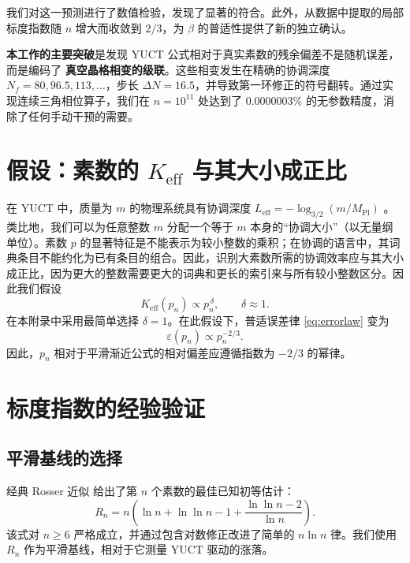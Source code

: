 \documentclass[11pt,a4paper]{article}
\begin{document}
	我们对这一预测进行了数值检验，发现了显著的符合。此外，从数据中提取的局部标度指数随 \(n\) 增大而收敛到 \(2/3\)，为 \(\beta\) 的普适性提供了新的独立确认。
	
	\textbf{本工作的主要突破}是发现 YUCT 公式相对于真实素数的残余偏差不是随机误差，而是编码了 \textbf{真空晶格相变的级联}。这些相变发生在精确的协调深度 \(N_f = 80, 96.5, 113, \dots\)，步长 \(\Delta N = 16.5\)，并导致第一环修正的符号翻转。通过实现连续三角相位算子，我们在 \(n=10^{11}\) 处达到了 \(0.0000003\%\) 的无参数精度，消除了任何手动干预的需要。
	
	\section{假设：素数的 \(K_{\mathrm{eff}}\) 与其大小成正比}
	在 YUCT 中，质量为 \(m\) 的物理系统具有协调深度 \(L_{\mathrm{eff}} = -\log_{3/2}(m/M_{\mathrm{Pl}})\) \cite{YakushevLaw2026}。类比地，我们可以为任意整数 \(m\) 分配一个等于 \(m\) 本身的“协调大小”（以无量纲单位）。素数 \(p\) 的显著特征是不能表示为较小整数的乘积；在协调的语言中，其词典条目不能约化为已有条目的组合。因此，识别大素数所需的协调效率应与其大小成正比，因为更大的整数需要更大的词典和更长的索引来与所有较小整数区分。因此我们假设
	\begin{equation}\label{eq:Keff-prime}
		K_{\mathrm{eff}}(p_n) \propto p_n^{\,\delta}, \qquad \delta \approx 1.
	\end{equation}
	在本附录中采用最简单选择 \(\delta = 1\)。在此假设下，普适误差律 \eqref{eq:errorlaw} 变为
	\begin{equation}\label{eq:error-prime}
		\varepsilon(p_n) \propto p_n^{-2/3}.
	\end{equation}
	因此，\(p_n\) 相对于平滑渐近公式的相对偏差应遵循指数为 \(-2/3\) 的幂律。
	
	\section{标度指数的经验验证}
	\subsection{平滑基线的选择}
	经典 Rosser 近似 \cite{Rosser1941} 给出了第 \(n\) 个素数的最佳已知初等估计：
	\begin{equation}\label{eq:rosser}
		R_n = n\!\left(\ln n + \ln\ln n - 1 + \frac{\ln\ln n - 2}{\ln n}\right).
	\end{equation}
	该式对 \(n \ge 6\) 严格成立，并通过包含对数修正改进了简单的 \(n\ln n\) 律。我们使用 \(R_n\) 作为平滑基线，相对于它测量 YUCT 驱动的涨落。
	
\end{document}
